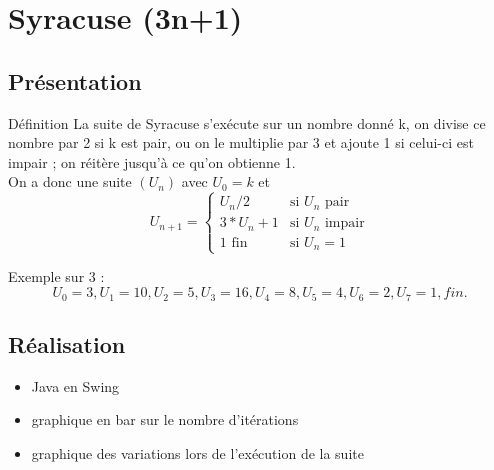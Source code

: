 \documentclass{beamer}
\begin{document}
\section{Syracuse (3n+1)}
\subsection*{Présentation}
\begin{frame}
\begin{block}{Définition}
La suite de Syracuse s'exécute sur un nombre donné k, on divise ce nombre par 2 si k est pair, ou on le multiplie par 3 et ajoute 1 si celui-ci est impair ; on réitère jusqu'à ce qu'on obtienne 1. \\
\vspace{0.4cm}
On a donc une suite $(U_n)$ avec $U_0 = k$ et 
$$
U_{n+1} = \left\{
    \begin{array}{ll}
        U_n/2 & \mbox{si } U_n \mbox{ pair} \\
        3*U_n + 1 & \mbox{si } U_n \mbox{ impair} \\
        1 \mbox{ fin} & \mbox{si } U_n = 1
    \end{array}
\right.
$$
\vspace{0.1cm}
\end{block}
Exemple sur 3 :
$$
U_0 = 3, U_1 = 10, U_2 = 5, U_3 = 16, U_4 = 8, U_5 = 4, U_6 = 2, U_7 = 1, fin.
$$

\end{frame}

\subsection{Réalisation}
\begin{frame}
\begin{itemize}
\item Java en Swing
\item graphique en bar sur le nombre d'itérations
\item graphique des variations lors de l'exécution de la suite
\end{itemize}
\end{frame}
\end{document}
